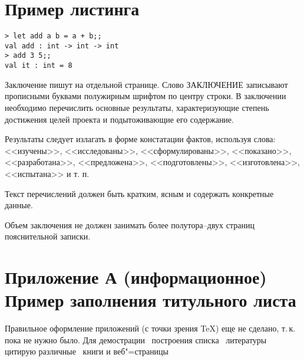 \section{Пример листинга} 
\label{sec:listing_example}
\begin{lstlisting}[style=fsharpstyle,caption={Пример автоматического вывода типа функции}]
> let add a b = a + b;;
val add : int -> int -> int
> add 3 5;;
val it : int = 8
\end{lstlisting}

Заключение пишут на отдельной странице. Слово ЗАКЛЮЧЕНИЕ записывают прописными буквами полужирным шрифтом по центру строки.
В заключении необходимо перечислить основные результаты, характеризующие степень достижения целей проекта и подытоживающие его содержание.

Результаты следует излагать в форме констатации фактов, используя слова: <<изучены>>, <<исследованы>>, <<сформулированы>>, <<показано>>, <<разработана>>, <<предложена>>, <<подготовлены>>, <<изготовлена>>, <<испытана>> и т. п.

Текст перечислений должен быть кратким, ясным и содержать конкретные данные.

Объем заключения не должен занимать более полутора–двух страниц пояснительной записки.



\section*{Приложение А (информационное)  Пример заполнения титульного листа} 
Правильное оформление приложений (с точки зрения \TeX{}) еще не сделано, т.\,к. пока не нужно было. 
Для демострации~\cite{Morozov_2011} построения списка~\cite[книженция]{kulezin_2004} литературы~\cite{guk_1999} цитирую различные~\cite{kluev_1989} книги и веб"=страницы~\cite{cite_webpage}

